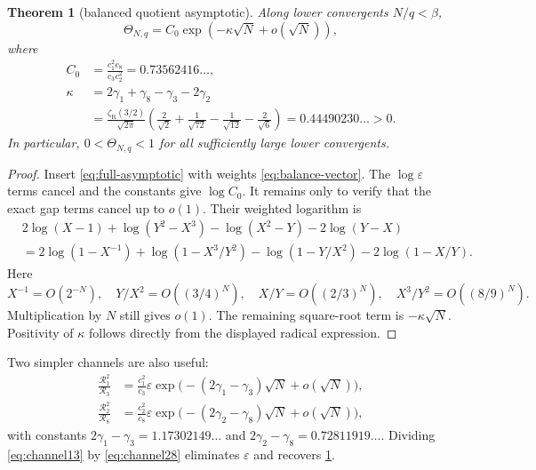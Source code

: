 \documentclass[11pt]{article}
\newtheorem{theorem}{Theorem}[section]
\theoremstyle{definition}
\theoremstyle{remark}
\newcommand{\eps}{\varepsilon}
\newcommand{\zR}{\zeta_{\!\mathrm R}}
\newcommand{\KappaThirteen}{1.17302149}
\newcommand{\KappaTwoEight}{0.72811919}
\newcommand{\KappaBalanced}{0.44490230}
\newcommand{\BalancedConstant}{0.73562416}
\begin{document}
\begin{theorem}[balanced quotient asymptotic]\label{thm:balanced}
Along lower convergents \(N/q<\beta\),
\begin{equation}\label{eq:theta-asymptotic}
\boxed{\quad
\Theta_{N,q}
=C_0\exp(-\kappa\sqrt N+o(\sqrt N)),
\quad}
\end{equation}
where
\begin{align}
C_0&=\frac{c_1^2c_8}{c_3c_2^2}=\BalancedConstant\ldots,\\
\kappa&=2\gamma_1+\gamma_8-\gamma_3-2\gamma_2\label{eq:kappa-def}\\
&=\frac{\zR(3/2)}{\sqrt{2\pi}}
\left(
\frac2{\sqrt2}+\frac1{\sqrt{72}}
-\frac1{\sqrt{12}}-\frac2{\sqrt6}
\right)
=\KappaBalanced\ldots>0.
\end{align}
In particular, \(0<\Theta_{N,q}<1\) for all sufficiently large lower convergents.
\end{theorem}

\begin{proof}
Insert \eqref{eq:full-asymptotic} with weights \eqref{eq:balance-vector}.  The \(\log\eps\) terms cancel and the constants give \(\log C_0\).  It remains only to verify that the exact gap terms cancel up to \(o(1)\).  Their weighted logarithm is
\begin{align*}
&2\log(X-1)+\log(Y^2-X^3)-\log(X^2-Y)-2\log(Y-X)\\
&=2\log(1-X^{-1})+\log(1-X^3/Y^2)
 -\log(1-Y/X^2)-2\log(1-X/Y).
\end{align*}
Here
\[
X^{-1}=O(2^{-N}),\quad Y/X^2=O((3/4)^N),\quad
X/Y=O((2/3)^N),\quad X^3/Y^2=O((8/9)^N).
\]
Multiplication by \(N\) still gives \(o(1)\).  The remaining square-root term is \(-\kappa\sqrt N\).  Positivity of \(\kappa\) follows directly from the displayed radical expression.
\end{proof}

Two simpler channels are also useful:
\begin{align}
\frac{\mathscr R_1^2}{\mathscr R_3}
&=\frac{c_1^2}{c_3}\eps
\exp\bigl(-(2\gamma_1-\gamma_3)\sqrt N+o(\sqrt N)\bigr),\label{eq:channel13}\\
\frac{\mathscr R_2^2}{\mathscr R_8}
&=\frac{c_2^2}{c_8}\eps
\exp\bigl(-(2\gamma_2-\gamma_8)\sqrt N+o(\sqrt N)\bigr),\label{eq:channel28}
\end{align}
with constants
\(2\gamma_1-\gamma_3=\KappaThirteen\ldots\) and
\(2\gamma_2-\gamma_8=\KappaTwoEight\ldots\).  Dividing \eqref{eq:channel13} by \eqref{eq:channel28} eliminates \(\eps\) and recovers \cref{thm:balanced}.
\end{document}
